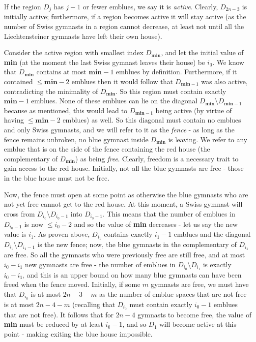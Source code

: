 {If the region $D_j$ has $j-1$ or fewer emblues, we say it is \emph{active}. Clearly, $D_{2n-3}$ is initially active; furthermore, if a region becomes active it will stay active (as the number of Swiss gymnasts in a region cannot decrease, at least not until all the Liechtensteiner gymnasts have left their own house). 

Consider the active region with smallest index $D_{\textbf{min}}$, and let the initial value of \textbf{min} (at the moment the last Swiss gymnast leaves their house) be $i_0$. We know that $D_{\textbf{min}}$ contains at most $\textbf{min}-1$ emblues by definition. Furthermore, if it contained $\le \textbf{min}-2$ emblues then it would follow that $D_{\textbf{min}-1}$ was also active, contradicting the minimality of $D_{\textbf{min}}$. So this region must contain exactly $\textbf{min}-1$ emblues. None of these emblues can lie on the diagonal $D_{\textbf{min}} \setminus D_{{\textbf{min}}-1}$ because as mentioned, this would lead to $D_{{\textbf{min}}-1}$ being active (by virtue of having $\le \textbf{min}-2$ emblues) as well. So this diagonal must contain no emblues and only Swiss gymnasts, and we will refer to it as the \emph{fence} - as long as the fence remains unbroken, no blue gymnast inside $D_{\textbf{min}}$ is leaving. We refer to any emblue that is on the side of the fence containing the red house (the complementary of $D_{\textbf{min}}$) as being \emph{free}. Clearly, freedom is a necessary trait to gain access to the red house. Initially, not all the blue gymnasts are free - those in the blue house must not be free. 

Now, the fence must open at some point as otherwise the blue gymnasts who are not yet free cannot get to the red house. At this moment, a Swiss gymnast will cross from $D_{i_0} \setminus D_{{i_0}-1}$ into $D_{{i_0}-1}$. This means that the number of emblues in $D_{{i_0}-1}$ is now $\le i_0-2$ and so the value of \textbf{min} decreases - let us say the new value is $i_1$. As proven above, $D_{i_1}$ contains exactly $i_1-1$ emblues and the diagonal $D_{i_1} \setminus D_{i_1-1}$ is the new fence; now, the blue gymnasts in the complementary of $D_{i_1}$ are free. So all the gymnasts who were previously free are still free, and at most $i_0 - i_1$ new gymnasts are free - the number of emblues in $D_{i_0} \setminus D_{i_1}$ is exactly $i_0 - i_1$, and this is an upper bound on how many blue gymnasts can have been freed when the fence moved. Initially, if some $m$ gymnasts are free, we must have that $D_{i_0}$ is at most $2n-3-m$ as the number of emblue spaces that are not free is at most $2n-4-m$ (recalling that $D_{i_0}$ must contain exactly $i_0-1$ emblues that are not free). It follows that for $2n-4$ gymnasts to become free, the value of \textbf{min} must be reduced by at least $i_0-1$, and so $D_1$ will become active at this point - making exiting the blue house impossible.

}
